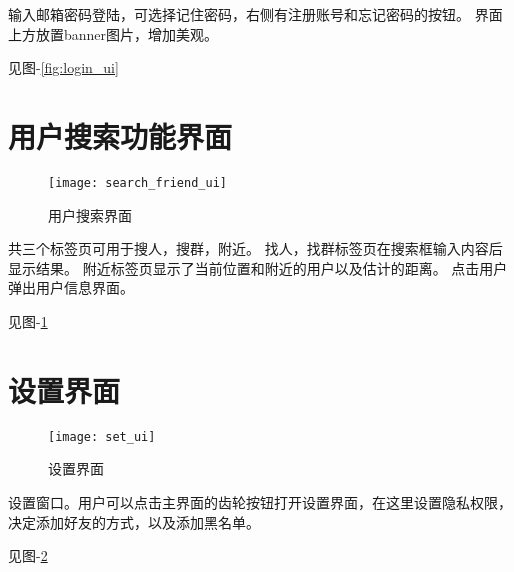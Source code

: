 输入邮箱密码登陆，可选择记住密码，右侧有注册账号和忘记密码的按钮。
界面上方放置banner图片，增加美观。

见图-\ref{fig:login_ui}


\section{用户搜索功能界面}
\begin{figure}[h]
	\centering
	\texttt{[image: search\_friend\_ui]}
	\caption{用户搜索界面} \label{fig:search_friend_ui}
\end{figure}

共三个标签页可用于搜人，搜群，附近。
找人，找群标签页在搜索框输入内容后显示结果。
附近标签页显示了当前位置和附近的用户以及估计的距离。
点击用户弹出用户信息界面。

见图-\ref{fig:search_friend_ui}

{\color{red}
\section{设置界面}
\begin{figure}[h]
	\centering
	\texttt{[image: set\_ui]}
	\caption{设置界面} \label{fig:set_ui}
\end{figure}

设置窗口。用户可以点击主界面的齿轮按钮打开设置界面，在这里设置隐私权限，决定添加好友的方式，以及添加黑名单。

见图-\ref{fig:set_ui}
}
